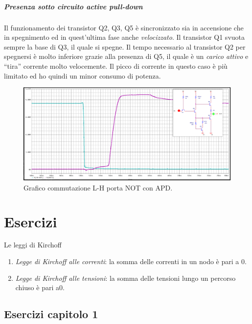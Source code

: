 \documentclass[
]{book}
\begin{document}
\paragraph{Presenza sotto circuito active
pull-down}\label{presenza-sotto-circuito-active-pull-down}

Il funzionamento dei transistor Q2, Q3, Q5 è sincronizzato sia in
accensione che in spegnimento ed in quest'ultima fase anche
\emph{velocizzato}. Il transistor Q1 svuota sempre la base di Q3, il
quale si spegne. Il tempo necessario al transistor Q2 per spegnersi è
molto inferiore grazie alla presenza di Q5, il quale è un \emph{carico
attivo} e ``tira'' corrente molto velocemente. \newline Il picco di
corrente in questo caso è più limitato ed ho quindi un minor consumo di
potenza.

\begin{figure}
\centering
\includegraphics[width=0.5\linewidth,height=\textheight,keepaspectratio]{assets/imgs/commutazione_l_h_apd.png}
\caption{Grafico commutazione L-H porta NOT con APD.}
\end{figure}

\appendix

\chapter{Esercizi}\label{esercizi}

\begin{bluebox}{Le leggi di Kirchoff}
\begin{enumerate}
\item \emph{Legge di Kirchoff alle correnti}: la somma delle correnti in un nodo è pari a 0.
\item \emph{Legge di Kirchoff alle tensioni}: la somma delle tensioni lungo un percorso chiuso è pari a0.
\end{enumerate}
\end{bluebox}

\section{Esercizi capitolo 1}\label{esercizi-capitolo-1}
\end{document}
